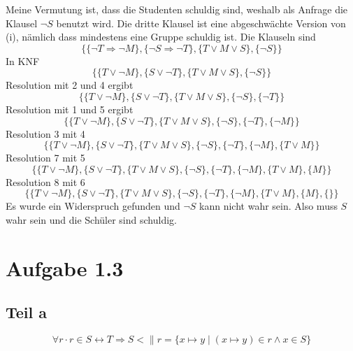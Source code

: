 \documentclass[10pt,a4paper]{article}
\begin{document}
Meine Vermutung ist, dass die Studenten schuldig sind, weshalb als Anfrage die Klausel $\neg S$ benutzt wird.
Die dritte Klausel ist eine abgeschwächte Version von (i), nämlich dass mindestens eine Gruppe schuldig ist.
Die Klauseln sind
\begin{equation}
  \{ \{ \neg T \Rightarrow \neg M \}, \{ \neg S \Rightarrow \neg T \}, \{ T \lor M \lor S \}, \{ \neg S \}\}
\end{equation}
In KNF
\begin{equation}
  \{ \{ T \lor \neg M \}, \{ S \lor \neg T \}, \{ T \lor M \lor S \}, \{ \neg S \}\}
\end{equation}
Resolution mit 2 und 4 ergibt
\begin{equation}
  \{ \{ T \lor \neg M \}, \{ S \lor \neg T \}, \{ T \lor M \lor S \}, \{ \neg S \}, \{ \neg T \}\}
\end{equation}
Resolution mit 1 und 5 ergibt
\begin{equation}
  \{ \{ T \lor \neg M \}, \{ S \lor \neg T \}, \{ T \lor M \lor S \}, \{ \neg S \}, \{ \neg T \}, \{ \neg M \}\}
\end{equation}
Resolution 3 mit 4
\begin{equation}
  \{ \{ T \lor \neg M \}, \{ S \lor \neg T \}, \{ T \lor M \lor S \}, \{ \neg S \}, \{ \neg T \}, \{ \neg M \}, \{ T \lor M \} \}
\end{equation}
Resolution 7 mit 5
\begin{equation}
  \{ \{ T \lor \neg M \}, \{ S \lor \neg T \}, \{ T \lor M \lor S \}, \{ \neg S \}, \{ \neg T \}, \{ \neg M \}, \{ T \lor M \}, \{ M \} \}
\end{equation}
Resolution 8 mit 6
\begin{equation}
  \{ \{ T \lor \neg M \}, \{ S \lor \neg T \}, \{ T \lor M \lor S \}, \{ \neg S \}, \{ \neg T \}, \{ \neg M \}, \{ T \lor M \}, \{ M \}, \{  \} \}
\end{equation}
Es wurde ein Widerspruch gefunden und $\neg S$ kann nicht wahr sein.
Also muss $S$ wahr sein und die Schüler sind schuldig.

\section{Aufgabe 1.3}

\subsection{Teil a}

\begin{equation}
  \forall r \cdot r \in S \leftrightarrow T \Rightarrow S <\| r = \{ x \mapsto y \mid (x \mapsto y) \in r \land x \in S \}
\end{equation}
\end{document}
